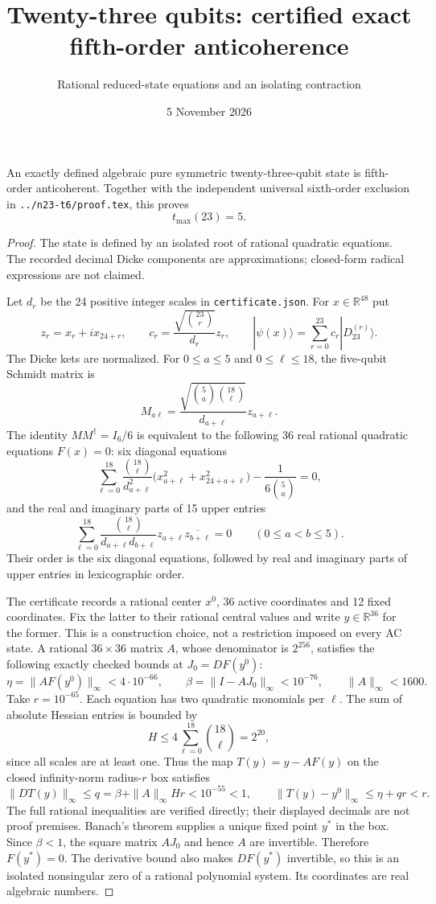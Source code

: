 \documentclass[11pt]{article}
\begin{document}
\title{Twenty-three qubits: certified exact fifth-order anticoherence}
\author{Rational reduced-state equations and an isolating contraction}
\date{5 November 2026}\maketitle
\begin{theorem}
An exactly defined algebraic pure symmetric twenty-three-qubit state is
fifth-order anticoherent. Together with the independent universal sixth-order
exclusion in \texttt{../n23-t6/proof.tex}, this proves
\[\boxed{t_{\max}(23)=5.}\]
\end{theorem}
\begin{proof}
The state is defined by an isolated root of rational quadratic equations.
The recorded decimal Dicke components are approximations; closed-form radical
expressions are not claimed.

Let $d_r$ be the 24 positive integer scales in \texttt{certificate.json}.
For $x\in\mathbb R^{48}$ put
\[
z_r=x_r+ix_{24+r},\qquad
c_r=\frac{\sqrt{\binom{23}{r}}}{d_r}z_r,\qquad
|\psi(x)\rangle=\sum_{r=0}^{23}c_r|D_{23}^{(r)}\rangle.
\]
The Dicke kets are normalized. For $0\le a\le5$ and $0\le\ell\le18$, the
five-qubit Schmidt matrix is
\[
M_{a\ell}=\frac{\sqrt{\binom5a\binom{18}\ell}}{d_{a+\ell}}z_{a+\ell}.
\]
The identity $MM^\dagger=I_6/6$ is equivalent to the following 36 real
rational quadratic equations $F(x)=0$: six diagonal equations
\[
\sum_{\ell=0}^{18}\frac{\binom{18}\ell}{d_{a+\ell}^2}
\bigl(x_{a+\ell}^2+x_{24+a+\ell}^2\bigr)
-\frac1{6\binom5a}=0,
\]
and the real and imaginary parts of 15 upper entries
\[
\sum_{\ell=0}^{18}\frac{\binom{18}\ell}{d_{a+\ell}d_{b+\ell}}
z_{a+\ell}\overline{z_{b+\ell}}=0\qquad(0\le a<b\le5).
\]
Their order is the six diagonal equations, followed by real and imaginary
parts of upper entries in lexicographic order.

The certificate records a rational center $x^0$, 36 active coordinates and
12 fixed coordinates. Fix the latter to their rational central values and
write $y\in\mathbb R^{36}$ for the former. This is a construction choice,
not a restriction imposed on every AC state.
A rational $36\times36$ matrix $A$, whose denominator is $2^{256}$, satisfies
the following exactly checked bounds at $J_0=DF(y^0)$:
\[
\eta=\|AF(y^0)\|_\infty<4\cdot10^{-66},\qquad
\beta=\|I-AJ_0\|_\infty<10^{-76},\qquad
\|A\|_\infty<1600.
\]
Take $r=10^{-65}$. Each equation has two quadratic monomials per $\ell$.
The sum of absolute Hessian entries is bounded by
\[
H\le4\sum_{\ell=0}^{18}\binom{18}\ell=2^{20},
\]
since all scales are at least one. Thus the map $T(y)=y-AF(y)$ on the closed
infinity-norm radius-$r$ box satisfies
\[
\|DT(y)\|_\infty\le q=\beta+\|A\|_\infty Hr<10^{-55}<1,
\qquad \|T(y)-y^0\|_\infty\le\eta+qr<r.
\]
The full rational inequalities are verified directly; their displayed
decimals are not proof premises. Banach's theorem supplies a unique fixed point
$y^*$ in the box. Since $\beta<1$, the square matrix $AJ_0$ and hence $A$ are
invertible. Therefore $F(y^*)=0$. The derivative bound also makes
$DF(y^*)$ invertible, so this is an isolated nonsingular zero of a rational
polynomial system. Its coordinates are real algebraic numbers.


\end{proof}
\end{document}
